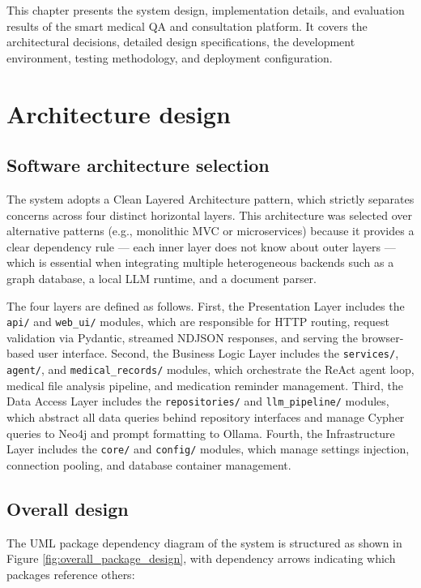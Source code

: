 \documentclass[../main.tex]{subfiles}
\begin{document}
This chapter presents the system design, implementation details, and evaluation results of the smart medical QA and consultation platform. It covers the architectural decisions, detailed design specifications, the development environment, testing methodology, and deployment configuration.

\section{Architecture design}
\label{section:4.1}

\subsection{Software architecture selection}
\label{subsection:4.1.1}

The system adopts a Clean Layered Architecture pattern, which strictly separates concerns across four distinct horizontal layers. This architecture was selected over alternative patterns (e.g., monolithic MVC or microservices) because it provides a clear dependency rule — each inner layer does not know about outer layers — which is essential when integrating multiple heterogeneous backends such as a graph database, a local LLM runtime, and a document parser.

The four layers are defined as follows. First, the Presentation Layer includes the \texttt{api/} and \texttt{web\_ui/} modules, which are responsible for HTTP routing, request validation via Pydantic, streamed NDJSON responses, and serving the browser-based user interface. Second, the Business Logic Layer includes the \texttt{services/}, \texttt{agent/}, and \texttt{medical\_records/} modules, which orchestrate the ReAct agent loop, medical file analysis pipeline, and medication reminder management. Third, the Data Access Layer includes the \texttt{repositories/} and \texttt{llm\_pipeline/} modules, which abstract all data queries behind repository interfaces and manage Cypher queries to Neo4j and prompt formatting to Ollama. Fourth, the Infrastructure Layer includes the \texttt{core/} and \texttt{config/} modules, which manage settings injection, connection pooling, and database container management.

\subsection{Overall design}
\label{subsection:4.1.2}

The UML package dependency diagram of the system is structured as shown in Figure \ref{fig:overall_package_design}, with dependency arrows indicating which packages reference others:
\end{document}
